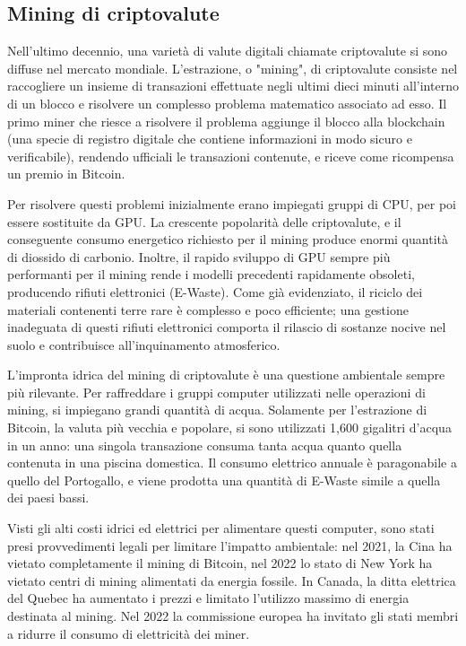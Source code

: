 \documentclass[12pt,a4paper,oneside]{book}
\begin{document}
\subsection{Mining di criptovalute}

Nell'ultimo decennio, una varietà di valute digitali chiamate criptovalute si sono diffuse nel mercato mondiale. L'estrazione, o "mining", di criptovalute consiste nel raccogliere un insieme di transazioni effettuate negli ultimi dieci minuti all'interno di un blocco e risolvere un complesso problema matematico associato ad esso. Il primo miner che riesce a risolvere il problema aggiunge il blocco alla blockchain (una specie di registro digitale che contiene informazioni in modo sicuro e verificabile), rendendo ufficiali le transazioni contenute, e riceve come ricompensa un premio in Bitcoin.

Per risolvere questi problemi inizialmente erano impiegati gruppi di CPU, per poi essere sostituite da GPU. La crescente popolarità delle criptovalute, e il conseguente consumo energetico richiesto per il mining produce enormi quantità di diossido di carbonio. Inoltre, il rapido sviluppo di GPU sempre più performanti per il mining rende i modelli precedenti rapidamente obsoleti, producendo rifiuti elettronici (E-Waste). Come già evidenziato, il riciclo dei materiali contenenti terre rare è complesso e poco efficiente; una gestione inadeguata di questi rifiuti elettronici comporta il rilascio di sostanze nocive nel suolo e contribuisce all'inquinamento atmosferico.

L'impronta idrica del mining di criptovalute è una questione ambientale sempre più rilevante. Per raffreddare i gruppi computer utilizzati nelle operazioni di mining, si impiegano grandi quantità di acqua. Solamente per l'estrazione di Bitcoin, la valuta più vecchia e popolare, si sono utilizzati 1,600 gigalitri d'acqua in un anno: una singola transazione consuma tanta acqua quanto quella contenuta in una piscina domestica. Il consumo elettrico annuale è paragonabile a quello del Portogallo, e viene prodotta una quantità di E-Waste simile a quella dei paesi bassi.

Visti gli alti costi idrici ed elettrici per alimentare questi computer, sono stati presi provvedimenti legali per limitare l'impatto ambientale: nel 2021, la Cina ha vietato completamente il mining di Bitcoin, nel 2022 lo stato di New York ha vietato centri di mining alimentati da energia fossile. In Canada, la ditta elettrica del Quebec ha aumentato i prezzi e limitato l'utilizzo massimo di energia destinata al mining. Nel 2022 la commissione europea ha invitato gli stati membri a ridurre il consumo di elettricità dei miner.
\end{document}
